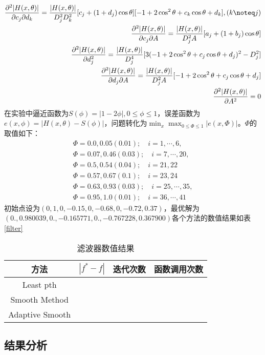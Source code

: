 \documentclass{ctexart}
\begin{document}
\begin{align}
	\frac{\partial^2{|H(x,\theta)|}}{\partial{c_j}\partial{d_k}}=\frac{|H(x,\theta)|}{D_j^2D_k^2}[c_j+(1+d_j)\cos\theta][-1+2\cos^2\theta+c_k\cos\theta+d_k],(k\noteq j)\\
	\frac{\partial^2{|H(x,\theta)|}}{\partial{c_j}\partial{A}}=\frac{|H(x,\theta)|}{D_j^2A}[a_j+(1+b_j)\cos\theta]\\
	\frac{\partial^2{|H(x,\theta)|}}{\partial{d_j^2}}=\frac{|H(x,\theta)|}{D_j^4}[3(-1+2\cos^2\theta+c_j\cos\theta+d_j)^2-D_j^2]\\
	\frac{\partial^2{|H(x,\theta)|}}{\partial{d_j}\partial{A}}=\frac{|H(x,\theta)|}{D_j^2A}[-1+2\cos^2\theta+c_j\cos\theta+d_j]\\	
	\frac{\partial^2{|H(x,\theta)|}}{\partial A^2}=0
\end{align}
在实验中逼近函数为$S(\phi) = |1-2\phi|,0\leq\phi\leq 1$，误差函数为$e(x,\phi)=|H(x,\theta)-S(\phi)|$，问题转化为$\min_x\max_{0\leq\Phi\leq 1}{|e(x,\Phi)|}$。$\Phi$的取值如下：
\begin{align}
	\Phi = 0.0, 0.05(0.01);\quad i=1,\cdots,6,\\
	\Phi = 0.07, 0.46(0.03);\quad i=7,\cdots,20,\\
	\Phi = 0.5, 0.54(0.04);\quad i=21,22\\
	\Phi = 0.57,0.67(0.1);\quad i=23,24\\
	\Phi = 0.63,0.93(0.03);\quad i=25,\cdots,35,\\
	\Phi = 0.95,1.0(0.01);\quad i=36,\cdots,41
\end{align}
初始点设为$(0,1,0,-0.15,0,-0.68,0,-0.72,0.37)$，最优解为$(0.,0.980039,0.,-0.165771,0.,-0.767228,0.367900)$各个方法的数值结果如表\ref{filter}
\begin{table}[htpb]
	\centering
	\caption{滤波器数值结果}
	\label{tab:rspro}
	\begin{tabular}{c c c c}
	\hine
	方法 & $|f^*-f|$ & 迭代次数 & 函数调用次数 \\\hline
	Least pth & & & \\
	Smooth Method & & & \\
	Adaptive Smooth & & & \\
	\hline
	\end{tabular}
\end{table}
\subsection{结果分析}
\end{document}
